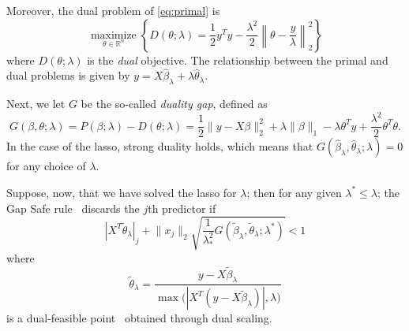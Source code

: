 \documentclass[b5paper,10pt,abstractoff,DIV=calc,headings=normal,twoside]{scrartcl}
\theoremstyle{plain}
\theoremstyle{definition}
\theoremstyle{remark}
\DeclareMathOperator{\sign}{sign}
\begin{document}
Moreover, the dual problem of \eqref{eq:primal} is
\begin{equation}
  \label{eq:dual}
  \operatorname*{maximize}_{\theta \in \mathbb{R}^n} \left\{ D(\theta; \lambda) =
  \frac 12 y^T y - \frac{\lambda^2}{2} \left\lVert \theta
  - \frac y \lambda \right\rVert_2^2\right\}
\end{equation}
where \(D(\theta; \lambda)\) is the \emph{dual} objective.
The relationship between the primal and dual problems is given by
\(y = X\hat\beta_\lambda + \lambda \hat\theta_\lambda.\)

Next, we let \(G\) be the so-called \emph{duality gap}, defined as
\begin{equation}
  G(\beta, \theta; \lambda)
  = P(\beta; \lambda) - D(\theta; \lambda)
  =
  \frac 12 \lVert y - X\beta\rVert_2^2 + \lambda \lVert \beta \rVert_1
  - \lambda \theta^T y + \frac{\lambda^2}{2} \theta^T \theta.
\end{equation}
In the case of the lasso, strong duality holds, which means that
\(G(\hat\beta_\lambda, \hat\theta_\lambda; \lambda) = 0\) for any
choice of \(\lambda\).

Suppose, now, that we have solved the lasso for \(\lambda\); then
for any given \(\lambda^* \leq \lambda\);
the Gap Safe rule~\citep{ndiaye2017} discards the \(j\)th
predictor if
\begin{equation}
  \label{eq:gap-safe-rule}
  |X^T \tilde \theta_\lambda|_j + \lVert x_j\rVert_2
  \sqrt{\frac{1}{\lambda_*^2}
    G(\tilde \beta_\lambda, \tilde \theta_\lambda; \lambda^*)}
  < 1
\end{equation}
where
\[
  \tilde\theta_\lambda = \frac{y - X\tilde\beta_\lambda}{
    \max\big( |X^T(y - X\tilde\beta_\lambda)|, \lambda\big)}
\]
is a dual-feasible point~\cite{ndiaye2017} obtained through dual scaling.
\end{document}
